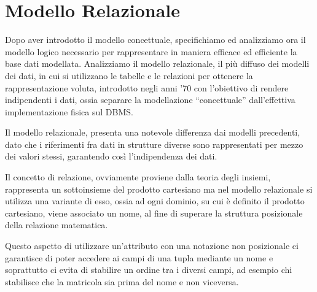 \documentclass[a4paper,12pt, oneside]{book}
\begin{document}
\chapter{Modello Relazionale}
Dopo aver introdotto il modello concettuale, specifichiamo ed analizziamo ora il modello logico necessario per
rappresentare in maniera efficace ed efficiente la base dati modellata.\newline
Analizziamo il modello relazionale, il più diffuso dei modelli dei dati, in cui si utilizzano le tabelle e le relazioni
per ottenere la rappresentazione voluta, introdotto negli anni '70 con l'obiettivo di rendere indipendenti i dati,
ossia separare la modellazione ``concettuale'' dall'effettiva implementazione fisica sul DBMS.

Il modello relazionale, presenta una notevole differenza dai modelli precedenti, dato che i riferimenti
fra dati in strutture diverse sono rappresentati per mezzo dei valori stessi, garantendo così l'indipendenza dei dati.

Il concetto di relazione, ovviamente proviene dalla teoria degli insiemi, rappresenta un sottoinsieme
del prodotto cartesiano ma nel modello relazionale si utilizza una variante di esso, ossia ad ogni dominio,
su cui è definito il prodotto cartesiano, viene associato un nome, al fine di superare 
la struttura posizionale della relazione matematica.

Questo aspetto di utilizzare un'attributo con una notazione non posizionale ci garantisce di poter 
accedere ai campi di una tupla mediante un nome e soprattutto ci evita di stabilire un ordine tra 
i diversi campi, ad esempio chi stabilisce che la matricola sia prima del nome e non viceversa.
\end{document}
